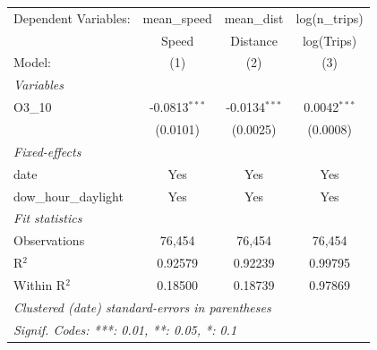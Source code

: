 \begingroup
\centering
\begin{tabular}{lccc}
   \tabularnewline \midrule \midrule
   Dependent Variables:  & mean\_speed     & mean\_dist      & log(n\_trips)\\   
                         & Speed           & Distance        & log(Trips) \\   
   Model:                & (1)             & (2)             & (3)\\  
   \midrule
   \emph{Variables}\\
   O3\_10                & -0.0813$^{***}$ & -0.0134$^{***}$ & 0.0042$^{***}$\\   
                         & (0.0101)        & (0.0025)        & (0.0008)\\   
   \midrule
   \emph{Fixed-effects}\\
   date                  & Yes             & Yes             & Yes\\  
   dow\_hour\_daylight   & Yes             & Yes             & Yes\\  
   \midrule
   \emph{Fit statistics}\\
   Observations          & 76,454          & 76,454          & 76,454\\  
   R$^2$                 & 0.92579         & 0.92239         & 0.99795\\  
   Within R$^2$          & 0.18500         & 0.18739         & 0.97869\\  
   \midrule \midrule
   \multicolumn{4}{l}{\emph{Clustered (date) standard-errors in parentheses}}\\
   \multicolumn{4}{l}{\emph{Signif. Codes: ***: 0.01, **: 0.05, *: 0.1}}\\
\end{tabular}
\par\endgroup
